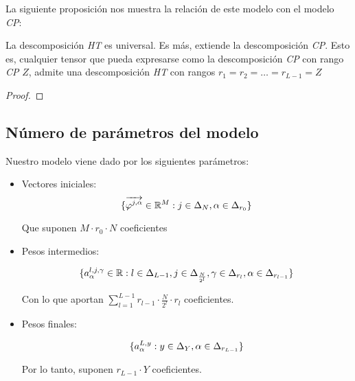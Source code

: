 La siguiente proposición nos muestra la relación de este modelo con el modelo \textit{CP}:

\begin{proposicion}
	La descomposición \textit{HT} es universal. Es más, extiende la descomposición \textit{CP}. Esto es, cualquier tensor que pueda expresarse como la descomposición \textit{CP} con rango \textit{CP} $Z$, admite una descomposición \textit{HT} con rangos $r_1 = r_2 = \ldots = r_{L - 1} = Z$
\end{proposicion}

\begin{proof}
\end{proof}

\subsection{Número de parámetros del modelo} \label{msubs:parametros_modelo_ht}

Nuestro modelo viene dado por los siguientes parámetros:

\begin{itemize}
	\item Vectores iniciales:
	      \begin{equation}
		      \{\overrightarrow{\varphi^{j, \alpha}} \in \mathbb{R}^M: j \in \Delta_{N}, \alpha \in \Delta_{r_0}  \}
	      \end{equation}

	      Que suponen $M \cdot r_0 \cdot N$ coeficientes
	\item Pesos intermedios:

	      \begin{equation}
		      \{ a^{l, j, \gamma}_{\alpha} \in \mathbb{R}: l \in \Delta_{L-1}, j \in \Delta_{\frac{N}{2^l}}, \gamma \in \Delta_{r_l}, \alpha \in \Delta_{r_{l-1}} \}
	      \end{equation}

	      Con lo que aportan $\sum_{l = 1}^{L-1} r_{l-1} \cdot \frac{N}{2^l} \cdot r_l$ coeficientes.

	\item Pesos finales:

	      \begin{equation}
		      \{a^{L, y}_{\alpha}: y \in \Delta_{Y}, \alpha \in \Delta_{r_{L-1}} \}
	      \end{equation}

	      Por lo tanto, suponen $r_{L-1} \cdot Y$ coeficientes.
\end{itemize}

